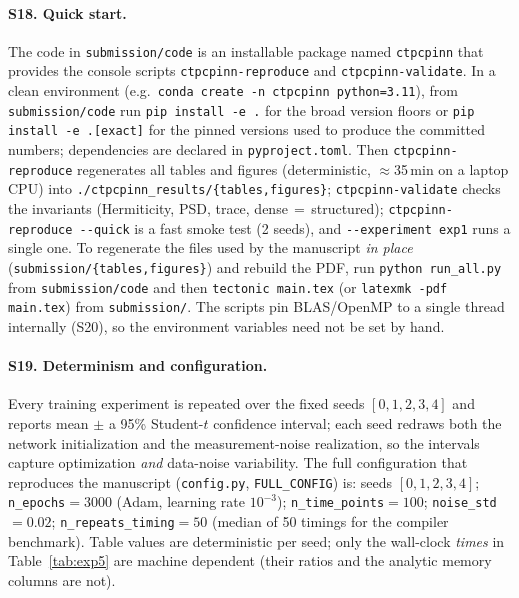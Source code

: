\documentclass[11pt]{article}
\begin{document}
\paragraph{S18. Quick start.}
The code in \texttt{submission/code} is an installable package named \texttt{ctpcpinn} that provides the console scripts \texttt{ctpcpinn-reproduce} and \texttt{ctpcpinn-validate}. In a clean environment (e.g.\ \texttt{conda create -n ctpcpinn python=3.11}), from \texttt{submission/code} run \texttt{pip install -e .} for the broad version floors or \texttt{pip install -e .[exact]} for the pinned versions used to produce the committed numbers; dependencies are declared in \texttt{pyproject.toml}. Then \texttt{ctpcpinn-reproduce} regenerates all tables and figures (deterministic, $\approx$35\,min on a laptop CPU) into \texttt{./ctpcpinn\_results/\{tables,figures\}}; \texttt{ctpcpinn-validate} checks the invariants (Hermiticity, PSD, trace, dense$\,=\,$structured); \texttt{ctpcpinn-reproduce -{}-quick} is a fast smoke test (2 seeds), and \texttt{-{}-experiment exp1} runs a single one. To regenerate the files used by the manuscript \emph{in place} (\texttt{submission/\{tables,figures\}}) and rebuild the PDF, run \texttt{python run\_all.py} from \texttt{submission/code} and then \texttt{tectonic main.tex} (or \texttt{latexmk -pdf main.tex}) from \texttt{submission/}. The scripts pin BLAS/OpenMP to a single thread internally (S20), so the environment variables need not be set by hand.

\paragraph{S19. Determinism and configuration.}
Every training experiment is repeated over the fixed seeds $[0,1,2,3,4]$ and reports mean $\pm$ a 95\% Student-$t$ confidence interval; each seed redraws both the network initialization and the measurement-noise realization, so the intervals capture optimization \emph{and} data-noise variability. The full configuration that reproduces the manuscript (\texttt{config.py}, \texttt{FULL\_CONFIG}) is: seeds $[0,1,2,3,4]$; \texttt{n\_epochs}$=3000$ (Adam, learning rate $10^{-3}$); \texttt{n\_time\_points}$=100$; \texttt{noise\_std}$=0.02$; \texttt{n\_repeats\_timing}$=50$ (median of 50 timings for the compiler benchmark). Table values are deterministic per seed; only the wall-clock \emph{times} in Table~\ref{tab:exp5} are machine dependent (their ratios and the analytic memory columns are not).
\end{document}
